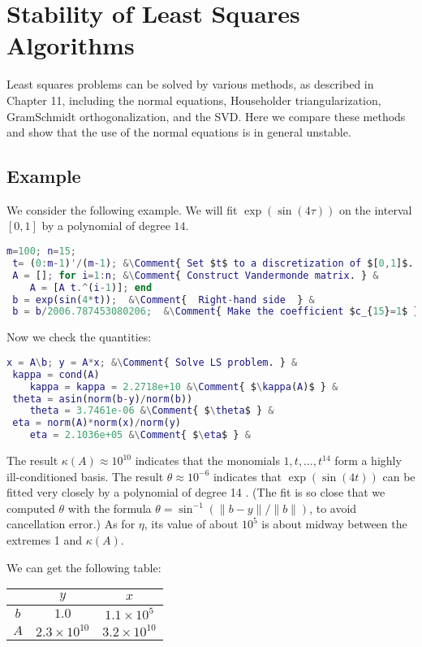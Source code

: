 \chapter{Stability of Least Squares Algorithms} 
Least squares problems can be solved by various methods, as described in Chapter 11, including the normal equations, Householder triangularization, GramSchmidt orthogonalization, and the SVD. Here we compare these methods and show that the use of the normal equations is in general unstable.

\section{Example} 
We consider the following example. We will fit $\exp(\sin (4\tau))$ on the interval $[0,1]$ by a polynomial of degree $14$.  

\begin{lstlisting}[language=Matlab]
 m=100; n=15;
 t= (0:m-1)'/(m-1); &\Comment{ Set $t$ to a discretization of $[0,1]$. } &
 A = []; for i=1:n; &\Comment{ Construct Vandermonde matrix. } &
    A = [A t.^(i-1)]; end 
 b = exp(sin(4*t));  &\Comment{  Right-hand side  } &
 b = b/2006.787453080206;  &\Comment{ Make the coefficient $c_{15}=1$ } &
\end{lstlisting}
Now we check the quantities: 
\begin{lstlisting}[language=Matlab]
 x = A\b; y = A*x; &\Comment{ Solve LS problem. } &
 kappa = cond(A) 
    kappa = kappa = 2.2718e+10 &\Comment{ $\kappa(A)$ } &   
 theta = asin(norm(b-y)/norm(b)) 
    theta = 3.7461e-06 &\Comment{ $\theta$ } &
 eta = norm(A)*norm(x)/norm(y)
    eta = 2.1036e+05 &\Comment{ $\eta$ } &
\end{lstlisting}

The result $\kappa(A) \approx 10^{10}$ indicates that the monomials $1, t, \ldots, t^{14}$ form a highly ill-conditioned basis. The result $\theta \approx 10^{-6}$ indicates that $\exp (\sin (4 t))$ can be fitted very closely by a polynomial of degree 14 . (The fit is so close that we computed $\theta$ with the formula $\theta=\sin ^{-1}(\|b-y\| /\|b\|)$, to avoid cancellation error.) As for $\eta$, its value of about $10^5$ is about midway between the extremes 1 and $\kappa(A)$. 

We can get the following table: 
\begin{table}[H]
    \centering
    \begin{tabular}{|c|c|c|}
    \hline 
    & $y$ &$x$ \\ 
    \hline 
    $b$ & $ 1.0 $ & $1.1\times 10^5$ \\ 
    \hline 
    $A$ & $2.3\times 10^{10}$ & $3.2\times 10^{10}$ \\ 
    \hline
    \end{tabular}
\end{table}

